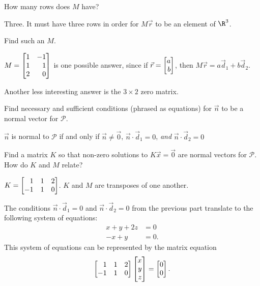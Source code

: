 	\begin{parts}
		\item How many rows does $M$ have?
			\begin{solution}
				Three. It must have three rows in order for $M\vec r$ to be an
				element of $\R^3$.
			\end{solution}
		\item Find such an $M$.
			\begin{solution}
				$M=\mat{1&-1\\1&1\\2&0}$ is one possible answer, since if
				$\vec r = \mat{a\\b}$, then $M \vec r = a \vec d_1 + b \vec d_2$.

				Another less interesting answer is the $3\times2$ zero matrix.
			\end{solution}
		\item Find necessary and sufficient conditions (phrased as equations) for
			$\vec n$ to be a normal vector for $\mathcal P$.
			\begin{solution}
				$\vec n$ is normal to $\mathcal P$ if and only if $\vec n\neq \vec 0$,
				$\vec n\cdot\vec d_1=0$, \emph{and} $\vec n\cdot\vec d_2=0$
			\end{solution}
		\item Find a matrix $K$ so that non-zero solutions to $K\vec x=\vec 0$ are normal
			vectors for $\mathcal P$. How do $K$ and $M$ relate?
			\begin{solution}
				$K = \mat{1&1&2\\-1&1&0}$. $K$ and $M$ are transposes of
				one another.

				The conditions $\vec n\cdot\vec d_1=0$ and $\vec n\cdot\vec d_2=0$
				from the previous part translate to the following system of equations:
				\begin{align*}
					x + y + 2z &= 0 \\
					-x + y &= 0.
				\end{align*}
				This system of equations can be represented by the matrix equation
				\[
					\mat{1&1&2\\-1&1&0}\mat{x\\y\\z} = \mat{0\\0}.
				\]
			\end{solution}
	\end{parts}


